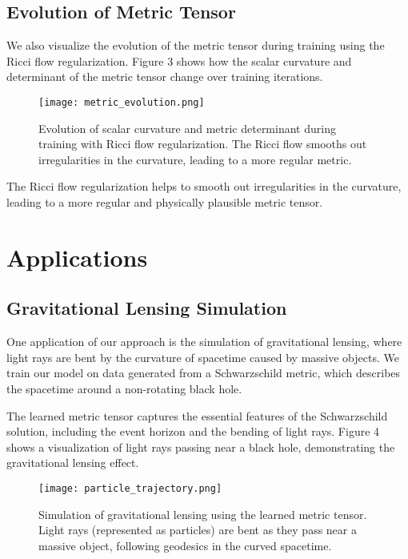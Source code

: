 \documentclass[11pt,a4paper]{article}
\begin{document}
\subsection{Evolution of Metric Tensor}

We also visualize the evolution of the metric tensor during training using the Ricci flow regularization. Figure 3 shows how the scalar curvature and determinant of the metric tensor change over training iterations.

\begin{figure}[h]
\centering
\texttt{[image: metric\_evolution.png]}
\caption{Evolution of scalar curvature and metric determinant during training with Ricci flow regularization. The Ricci flow smooths out irregularities in the curvature, leading to a more regular metric.}
\end{figure}

The Ricci flow regularization helps to smooth out irregularities in the curvature, leading to a more regular and physically plausible metric tensor.

\section{Applications}
\subsection{Gravitational Lensing Simulation}

One application of our approach is the simulation of gravitational lensing, where light rays are bent by the curvature of spacetime caused by massive objects. We train our model on data generated from a Schwarzschild metric, which describes the spacetime around a non-rotating black hole.

The learned metric tensor captures the essential features of the Schwarzschild solution, including the event horizon and the bending of light rays. Figure 4 shows a visualization of light rays passing near a black hole, demonstrating the gravitational lensing effect.

\begin{figure}[h]
\centering
\texttt{[image: particle\_trajectory.png]}
\caption{Simulation of gravitational lensing using the learned metric tensor. Light rays (represented as particles) are bent as they pass near a massive object, following geodesics in the curved spacetime.}
\end{figure}
\end{document}
